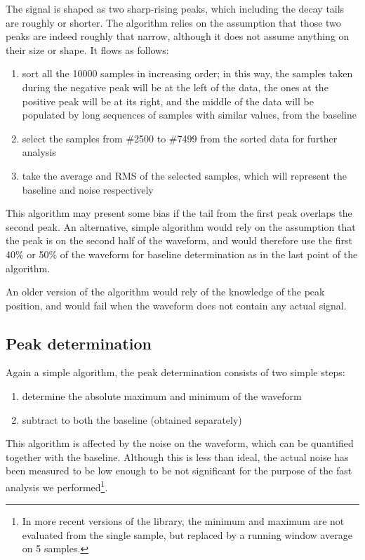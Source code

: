 The signal is shaped as two sharp-rising peaks, which including the
decay tails are roughly  or shorter. The algorithm relies on the
assumption that those two peaks are indeed roughly that narrow, although
it does not assume anything on their size or shape. It flows as follows:
\begin{enumerate}
  \item
    sort all the 10000 samples in increasing order; in this way, the
    samples taken during the negative peak will be at the left of the
    data, the ones at the positive peak will be at its right, and the
    middle of the data will be populated by long sequences of samples with
    similar values, from the baseline
  \item
    select the samples from \#2500 to \#7499 from the sorted data for
    further analysis
  \item
    take the average and RMS of the selected samples, which will represent
    the baseline and noise respectively
\end{enumerate}
This algorithm may present some bias if the tail from the first peak
overlaps the second peak. An alternative, simple algorithm would rely on
the assumption that the peak is on the second half of the waveform, and
would therefore use the first 40\% or 50\% of the waveform for baseline
determination as in the last point of the algorithm.

An older version of the algorithm would rely of the knowledge of the
peak position, and would fail when the waveform does not contain any
actual signal.


\subsection{Peak determination}
\label{sec:peak-determination}


Again a simple algorithm, the peak determination consists of two simple
steps:
\begin{enumerate}
  \item
    determine the absolute maximum and minimum of the waveform
  \item
    subtract to both the baseline (obtained separately)
\end{enumerate}
This algorithm is affected by the noise on the waveform, which can be
quantified together with the baseline. Although this is less than ideal,
the actual noise has been measured to be low enough to be not
significant for the purpose of the fast analysis we performed\footnote{%
In more recent versions of the library, the minimum and maximum
are not evaluated from the single sample, but replaced by a running
window average on 5 samples.
}.


